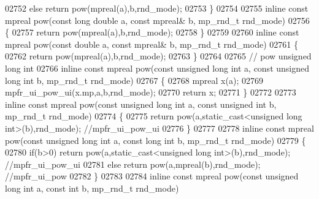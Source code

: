 \begin{DoxyCode}
{{02752     \textcolor{keywordflow}{else}          \textcolor{keywordflow}{return} pow(mpreal(a),b,rnd\_mode);
02753 \}
02754 
02755 \textcolor{keyword}{inline} \textcolor{keyword}{const} mpreal pow(\textcolor{keyword}{const} \textcolor{keywordtype}{long} \textcolor{keywordtype}{double} a, \textcolor{keyword}{const} mpreal& b, mp\_rnd\_t rnd\_mode)
02756 \{
02757     \textcolor{keywordflow}{return} pow(mpreal(a),b,rnd\_mode);
02758 \}
02759 
02760 \textcolor{keyword}{inline} \textcolor{keyword}{const} mpreal pow(\textcolor{keyword}{const} \textcolor{keywordtype}{double} a, \textcolor{keyword}{const} mpreal& b, mp\_rnd\_t rnd\_mode)
02761 \{
02762     \textcolor{keywordflow}{return} pow(mpreal(a),b,rnd\_mode);
02763 \}
02764 
02765 \textcolor{comment}{// pow unsigned long int}
02766 \textcolor{keyword}{inline} \textcolor{keyword}{const} mpreal pow(\textcolor{keyword}{const} \textcolor{keywordtype}{unsigned} \textcolor{keywordtype}{long} \textcolor{keywordtype}{int} a, \textcolor{keyword}{const} \textcolor{keywordtype}{unsigned} \textcolor{keywordtype}{long} \textcolor{keywordtype}{int} b, mp\_rnd\_t rnd\_mode)
02767 \{
02768     mpreal x(a);
02769     mpfr\_ui\_pow\_ui(x.mp,a,b,rnd\_mode);
02770     \textcolor{keywordflow}{return} x;
02771 \}
02772 
02773 \textcolor{keyword}{inline} \textcolor{keyword}{const} mpreal pow(\textcolor{keyword}{const} \textcolor{keywordtype}{unsigned} \textcolor{keywordtype}{long} \textcolor{keywordtype}{int} a, \textcolor{keyword}{const} \textcolor{keywordtype}{unsigned} \textcolor{keywordtype}{int} b, mp\_rnd\_t rnd\_mode)
02774 \{
02775     \textcolor{keywordflow}{return} pow(a,static\_cast<unsigned long int>(b),rnd\_mode); \textcolor{comment}{//mpfr\_ui\_pow\_ui}
02776 \}
02777 
02778 \textcolor{keyword}{inline} \textcolor{keyword}{const} mpreal pow(\textcolor{keyword}{const} \textcolor{keywordtype}{unsigned} \textcolor{keywordtype}{long} \textcolor{keywordtype}{int} a, \textcolor{keyword}{const} \textcolor{keywordtype}{long} \textcolor{keywordtype}{int} b, mp\_rnd\_t rnd\_mode)
02779 \{
02780     \textcolor{keywordflow}{if}(b>0)    \textcolor{keywordflow}{return} pow(a,static\_cast<unsigned long int>(b),rnd\_mode); \textcolor{comment}{//mpfr\_ui\_pow\_ui}
02781     \textcolor{keywordflow}{else}       \textcolor{keywordflow}{return} pow(a,mpreal(b),rnd\_mode); \textcolor{comment}{//mpfr\_ui\_pow}
02782 \}
02783 
02784 \textcolor{keyword}{inline} \textcolor{keyword}{const} mpreal pow(\textcolor{keyword}{const} \textcolor{keywordtype}{unsigned} \textcolor{keywordtype}{long} \textcolor{keywordtype}{int} a, \textcolor{keyword}{const} \textcolor{keywordtype}{int} b, mp\_rnd\_t rnd\_mode)
}}
\end{DoxyCode}
